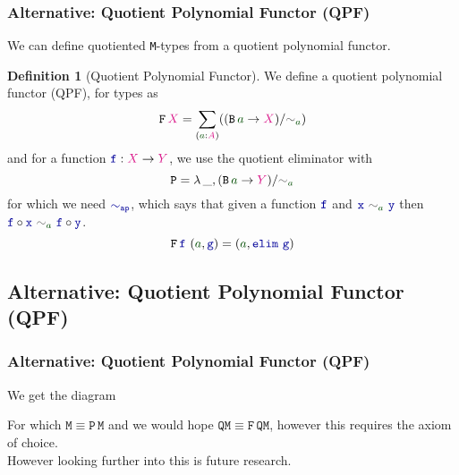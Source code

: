 \documentclass[xelatex,mathserif,serif,notheorems]{beamer} %
\theoremstyle{plain} %
\theoremstyle{definition}
\newtheorem{defn}[thm]{Definition}%
\theoremstyle{remark}
\newcommand*{\term}[1]{\textcolor{green!30!black}{#1}} %
\newcommand*{\type}[1]{\textcolor{magenta!90!black}{#1}}
\newcommand*{\unit}{\type{\textbf{1}}}
\newcommand*{\relation}[1]{\textcolor{gray!75!black}{\ensuremath{\mathtt{#1}}}}
\newcommand*{\function}[1]{\textcolor{blue!60!black}{\ensuremath{\mathtt{#1}}}}
\newcommand*{\typeformer}[1]{\ensuremath{\mathtt{#1}}}
\newcommand*{\functor}[1]{\ensuremath{\mathbf{\mathtt{#1}}}}
\newcommand{\setlengths}{
  \setlength{\abovedisplayskip}{4pt}
  \setlength{\belowdisplayskip}{4pt}
  \setlength{\abovedisplayshortskip}{2pt}
  \setlength{\belowdisplayshortskip}{2pt}
}
\begin{document}
\begin{frame}
  \frametitle{Alternative: Quotient Polynomial Functor (QPF)}
  We can define quotiented \texttt{M}-types from a quotient polynomial functor.
  \begin{defn}[Quotient Polynomial Functor]\setlengths
    We define a quotient polynomial functor (QPF), for types as
    \begin{equation}
      \functor{F}\,\type{X} =  \sum_{(\term{a} : \type{A})} ((\typeformer{B}\,\term{a} \rightarrow \type{X}) / \relation{\sim}_{\term{a}})
    \end{equation}
    and for a function \(\function{f} : \type{X} \rightarrow \type{Y}\), we use the quotient eliminator with
    \begin{equation}
      \typeformer{P} = \lambda\,\_, (\typeformer{B}\,\term{a} \rightarrow \type{Y})/\relation{\sim}_{\term{a}}
    \end{equation}
    for which we need \(\function{\sim_{ap}}\), which says that given a function \(\function{f}\) and \(\function{x}~\relation{\sim}_{\term{a}}~\function{y}\) then \(\function{f} \circ \function{x}~\relation{\sim}_{\term{a}}~\function{f} \circ \function{y}\).
    \begin{equation}
      \functor{F}\,\function{f}~(\term{a} , \function{g}) = (\term{a} , \function{elim}~\function{g})
    \end{equation}
  \end{defn}
\end{frame}

\subsection{Alternative: Quotient Polynomial Functor (QPF)}
\begin{frame}[fragile]
  \frametitle{Alternative: Quotient Polynomial Functor (QPF)}
  We get the diagram
  \begin{figure}
    \centering
  \end{figure}
  For which \(\typeformer{M} \equiv \functor{P}\,\typeformer{M}\) and we would hope \(\typeformer{QM} \equiv \functor{F}\,\typeformer{QM}\), however this requires the axiom of choice.
  \\[3mm]
  \pause
  However looking further into this is future research.
\end{frame}
\end{document}
